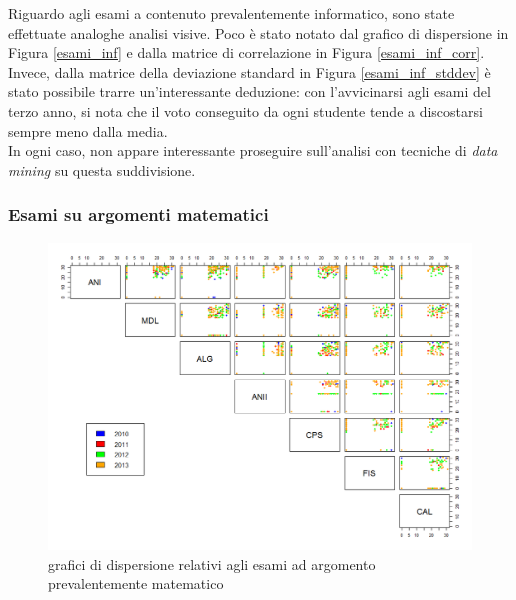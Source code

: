                 Riguardo agli esami a contenuto prevalentemente informatico, sono state effettuate analoghe analisi visive. Poco è stato notato dal grafico di dispersione in Figura \ref{esami_inf} e dalla matrice di correlazione in Figura \ref{esami_inf_corr}. Invece, dalla matrice della deviazione standard in Figura \ref{esami_inf_stddev} è stato possibile trarre un'interessante deduzione: con l’avvicinarsi agli esami del terzo anno, si nota che il voto conseguito da ogni studente tende a discostarsi sempre meno dalla media. \\

                In ogni caso, non appare interessante proseguire sull'analisi con tecniche di \textit{data mining} su questa suddivisione.

            \subsubsection{Esami su argomenti matematici}

                \begin{figure}
                    \centering
                    \caption{grafici di dispersione relativi agli esami ad argomento prevalentemente matematico}
                    \label{esami_mat}
                	\includegraphics[scale=0.38]{img/scatter_plot_8_gen.png}
                \end{figure}

